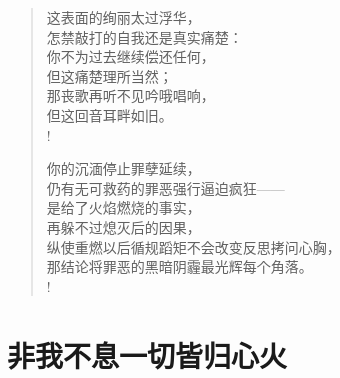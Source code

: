 \documentclass[UTF8, 12pt, a4paper]{ctexrep} %
\begin{document}
\begin{verse}
    这表面的绚丽太过浮华，\\
    怎禁敲打的自我还是真实痛楚：\\
    你不为过去继续偿还任何，\\
    但这痛楚理所当然；\\
    那丧歌再听不见吟哦唱响，\\
    但这回音耳畔如旧。\\!

    你的沉湎停止罪孽延续，\\
    仍有无可救药的罪恶强行逼迫疯狂——\\
    是给了火焰燃烧的事实，\\
    再躲不过熄灭后的因果，\\
    纵使重燃以后循规蹈矩不会改变反思拷问心胸，\\
    那结论将罪恶的黑暗阴霾最光辉每个角落。\\!

\end{verse}
\newpage

\section*{非我不息一切皆归心火}
\newpage
\end{document}
